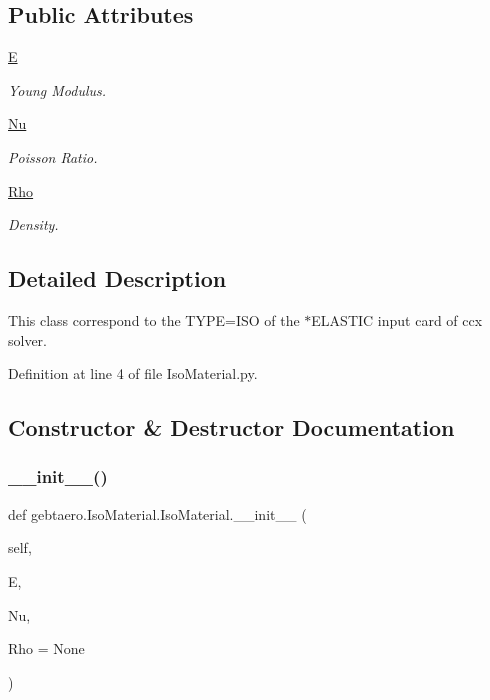 \subsection*{Public Attributes}
\begin{DoxyCompactItemize}
\item 
\hyperlink{classgebtaero_1_1_iso_material_1_1_iso_material_a95ef904760eb41f521d8a921fc44e5ba}{E}
\begin{DoxyCompactList}\small\item\em Young Modulus. \end{DoxyCompactList}\item 
\hyperlink{classgebtaero_1_1_iso_material_1_1_iso_material_a1a590e5600152a083c4ee3d0fb12451a}{Nu}
\begin{DoxyCompactList}\small\item\em Poisson Ratio. \end{DoxyCompactList}\item 
\hyperlink{classgebtaero_1_1_iso_material_1_1_iso_material_ace8e4cdd649efe5f36fd0093afa6b93a}{Rho}
\begin{DoxyCompactList}\small\item\em Density. \end{DoxyCompactList}\end{DoxyCompactItemize}


\subsection{Detailed Description}
This class correspond to the T\+Y\+PE=I\+SO of the $\ast$\+E\+L\+A\+S\+T\+IC input card of ccx solver. 

Definition at line 4 of file Iso\+Material.\+py.



\subsection{Constructor \& Destructor Documentation}
\mbox{\label{classgebtaero_1_1_iso_material_1_1_iso_material_ae9bef5bb23ffa56bd8342ecb0bf11ced}} 
\subsubsection{\texorpdfstring{\+\_\+\+\_\+init\+\_\+\+\_\+()}{\_\_init\_\_()}}
{\footnotesize\ttfamily def gebtaero.\+Iso\+Material.\+Iso\+Material.\+\_\+\+\_\+init\+\_\+\+\_\+ (\begin{DoxyParamCaption}\item[{}]{self,  }\item[{}]{E,  }\item[{}]{Nu,  }\item[{}]{Rho = {\ttfamily None} }\end{DoxyParamCaption})}



